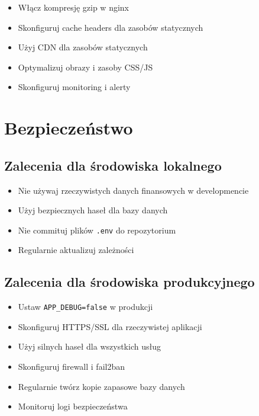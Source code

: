 \documentclass[12pt,a4paper]{article}
\begin{document}
    \begin{itemize}
        \item Włącz kompresję gzip w nginx
        \item Skonfiguruj cache headers dla zasobów statycznych
        \item Użyj CDN dla zasobów statycznych
        \item Optymalizuj obrazy i zasoby CSS/JS
        \item Skonfiguruj monitoring i alerty
    \end{itemize}

    \section{Bezpieczeństwo}

    \subsection{Zalecenia dla środowiska lokalnego}

    \begin{itemize}
        \item Nie używaj rzeczywistych danych finansowych w developmencie
        \item Użyj bezpiecznych haseł dla bazy danych
        \item Nie commituj plików \texttt{.env} do repozytorium
        \item Regularnie aktualizuj zależności
    \end{itemize}

    \subsection{Zalecenia dla środowiska produkcyjnego}

    \begin{itemize}
        \item Ustaw \texttt{APP\_DEBUG=false} w produkcji
        \item Skonfiguruj HTTPS/SSL dla rzeczywistej aplikacji
        \item Użyj silnych haseł dla wszystkich usług
        \item Skonfiguruj firewall i fail2ban
        \item Regularnie twórz kopie zapasowe bazy danych
        \item Monitoruj logi bezpieczeństwa
    \end{itemize}
\end{document}
